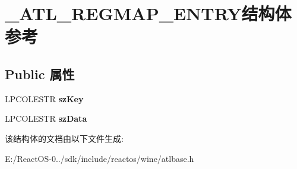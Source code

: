 \hypertarget{struct___a_t_l___r_e_g_m_a_p___e_n_t_r_y}{}\section{\+\_\+\+A\+T\+L\+\_\+\+R\+E\+G\+M\+A\+P\+\_\+\+E\+N\+T\+R\+Y结构体 参考}
\label{struct___a_t_l___r_e_g_m_a_p___e_n_t_r_y}
\subsection*{Public 属性}
\begin{DoxyCompactItemize}
\item 
\mbox{\label{struct___a_t_l___r_e_g_m_a_p___e_n_t_r_y_a49297b322e0ba2ef24c27569b0813b8f}} 
L\+P\+C\+O\+L\+E\+S\+TR {\bfseries sz\+Key}
\item 
\mbox{\label{struct___a_t_l___r_e_g_m_a_p___e_n_t_r_y_a7e1c348739686801fa6650f21d34946a}} 
L\+P\+C\+O\+L\+E\+S\+TR {\bfseries sz\+Data}
\end{DoxyCompactItemize}


该结构体的文档由以下文件生成\+:\begin{DoxyCompactItemize}
\item 
E\+:/\+React\+O\+S-\/0../sdk/include/reactos/wine/atlbase.\+h\end{DoxyCompactItemize}
